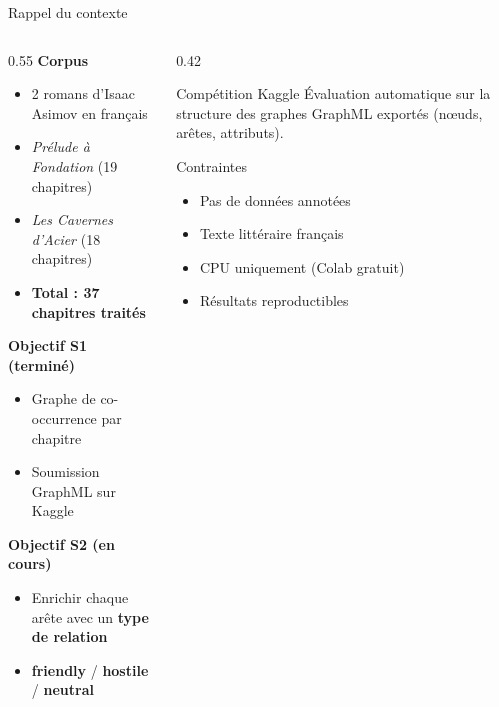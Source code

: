 \documentclass[aspectratio=169]{beamer}
\begin{document}
\begin{frame}{Rappel du contexte}
  \small
  \begin{columns}[T]
    \begin{column}{0.55\textwidth}
      \textbf{Corpus}
      \begin{itemize}\setlength{\itemsep}{1pt}
        \item 2 romans d'Isaac Asimov en français
        \item \textit{Prélude à Fondation} (19 chapitres)
        \item \textit{Les Cavernes d'Acier} (18 chapitres)
        \item \textbf{Total : 37 chapitres traités}
      \end{itemize}
      \vspace{3pt}
      \textbf{Objectif S1 (terminé)}
      \begin{itemize}\setlength{\itemsep}{1pt}
        \item Graphe de co-occurrence par chapitre
        \item Soumission GraphML sur Kaggle
      \end{itemize}
      \vspace{3pt}
      \textbf{Objectif S2 (en cours)}
      \begin{itemize}\setlength{\itemsep}{1pt}
        \item Enrichir chaque arête avec un \textbf{type de relation}
        \item \textcolor{friendly}{\textbf{friendly}} /
              \textcolor{hostile}{\textbf{hostile}} /
              \textcolor{neutral}{\textbf{neutral}}
      \end{itemize}
    \end{column}
    \begin{column}{0.42\textwidth}
      \begin{block}{Compétition Kaggle}
        \footnotesize
        Évaluation automatique sur la structure des graphes GraphML
        exportés (nœuds, arêtes, attributs).
      \end{block}
      \vspace{4pt}
      \begin{block}{Contraintes}
        \footnotesize
        \begin{itemize}\setlength{\itemsep}{0pt}
          \item Pas de données annotées
          \item Texte littéraire français
          \item CPU uniquement (Colab gratuit)
          \item Résultats reproductibles
        \end{itemize}
      \end{block}
    \end{column}
  \end{columns}
\end{frame}
\end{document}
